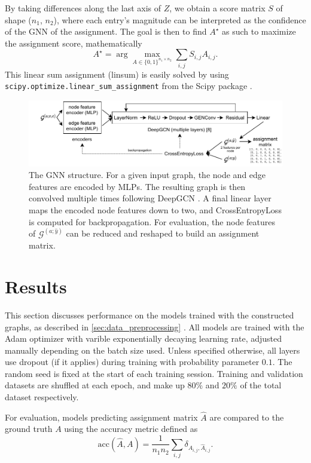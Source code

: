 \documentclass[10pt,conference,compsocconf,a4paper]{IEEEtran}
\newcommand{\G}{\mathcal{G}}
\newcommand*{\shortautoref}[1]{%
	\begingroup
	\def\equationautorefname{\textsc{Eq.}}%
	\def\tableautorefname{\textsc{Tab.}}%
	\def\figureautorefname{\textsc{Fig.}}%
	\autoref{#1}%
	\endgroup
}
\begin{document}
		By taking differences along the last axis of $Z$, we obtain a score matrix $S$ of shape ($n_1$, $n_2$), where each entry's magnitude can be interpreted as the confidence of the GNN of the assignment. The goal is then to find $A^\star$ as such to maximize the assignment score, mathematically
		$$
			A^\star = \arg \max_{A \in \{0, 1\}^{n_1 \times n_2}} \sum_{i,j} S_{i,j} A_{i,j}.
		$$
		This linear sum assignment (linsum) is easily solved by using \texttt{scipy.optimize.linear\_sum\_assignment} from the Scipy package \cite{2020SciPy-NMeth}.

		\begin{figure}
			\centering
			\includegraphics[width=\linewidth]{figures/nn.pdf}
			\caption{The GNN structure. For a given input graph, the node and edge features are encoded by MLPs. The resulting graph is then convolved multiple times following DeepGCN \cite{li_deepergcn_2020}. A final linear layer maps the encoded node features down to two, and CrossEntropyLoss is computed for backpropagation. For evaluation, the node features of $\G^{(a;\hat y)}$ can be reduced and reshaped to build an assignment matrix.}
			\label{fig:nn}
		\end{figure}


\section{Results}

	This section discusses performance on the models trained with the constructed graphs, as described in \shortautoref{sec:data_preprocessing}. All models are trained with the Adam optimizer with varible exponentially decaying learning rate, adjusted manually depending on the batch size used. Unless specified otherwise, all layers use dropout (if it applies) during training with probability parameter $0.1$. The random seed is fixed at the start of each training session. Training and validation datasets are shuffled at each epoch, and make up $80\%$ and $20\%$ of the total dataset respectively.

	For evaluation, models predicting assignment matrix $\hat A$ are compared to the ground truth $A$ using the accuracy metric defined as
	$$
		\textrm{acc}(\hat A, A) = \frac{1}{n_1 n_2} \sum_{i,j} \delta_{A_{i,j}, \hat{A}_{i,j}}.
	$$
\end{document}
